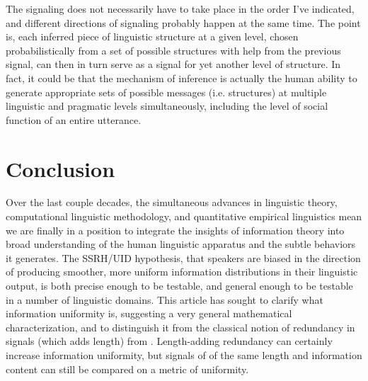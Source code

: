 \documentclass[12pt]{article}
\begin{document}
The signaling does not necessarily have to take place in the order I've indicated, and different directions of signaling probably happen at the same time. The point is, each inferred piece of linguistic structure at a given level, chosen probabilistically from a set of possible structures with help from the previous signal, can then in turn serve as a signal for yet another level of structure. In fact, it could be that the mechanism of inference is actually the human ability to generate appropriate sets of possible messages (i.e. structures) at multiple linguistic and pragmatic levels simultaneously, including the level of social function of an entire utterance. 

\section{Conclusion}

Over the last couple decades, the simultaneous advances in linguistic theory, computational linguistic methodology, and quantitative empirical linguistics mean we are finally in a position to integrate the insights of information theory into broad understanding of the human linguistic apparatus and the subtle behaviors it generates. The SSRH/UID hypothesis, that speakers are biased in the direction of producing smoother, more uniform information distributions in their linguistic output, is both precise enough to be testable, and general enough to be testable in a number of linguistic domains. This article has sought to clarify what information uniformity is, suggesting a very general mathematical characterization, and to distinguish it from the classical notion of redundancy in signals (which adds length) from \citet{shannon1948}. Length-adding redundancy can certainly increase information uniformity, but signals of of the same length and information content can still be compared on a metric of uniformity.
\end{document}
